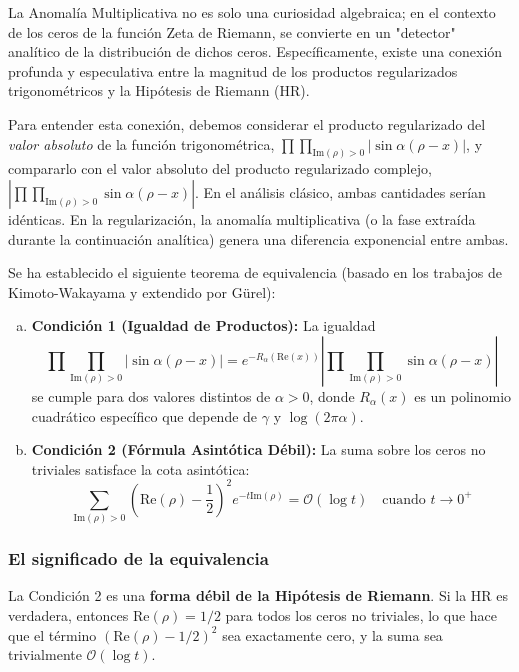La Anomalía Multiplicativa no es solo una curiosidad algebraica; en el contexto de los ceros de la función Zeta de Riemann, se convierte en un "detector" analítico de la distribución de dichos ceros. Específicamente, existe una conexión profunda y especulativa entre la magnitud de los productos regularizados trigonométricos y la Hipótesis de Riemann (HR).

Para entender esta conexión, debemos considerar el producto regularizado del \textit{valor absoluto} de la función trigonométrica, $\prod\prod_{\text{Im}(\rho)>0} |\sin \alpha(\rho - x)|$, y compararlo con el valor absoluto del producto regularizado complejo, $\left| \prod\prod_{\text{Im}(\rho)>0} \sin \alpha(\rho - x) \right|$. En el análisis clásico, ambas cantidades serían idénticas. En la regularización, la anomalía multiplicativa (o la fase extraída durante la continuación analítica) genera una diferencia exponencial entre ambas.

Se ha establecido el siguiente teorema de equivalencia (basado en los trabajos de Kimoto-Wakayama y extendido por Gürel):

\begin{enumerate}[a)]
    \item \textbf{Condición 1 (Igualdad de Productos):} La igualdad
    $$ \prod\prod_{\text{Im}(\rho)>0} |\sin \alpha(\rho - x)| = e^{-R_\alpha(\text{Re}(x))} \left| \prod\prod_{\text{Im}(\rho)>0} \sin \alpha(\rho - x) \right| $$
    se cumple para dos valores distintos de $\alpha > 0$, donde $R_\alpha(x)$ es un polinomio cuadrático específico que depende de $\gamma$ y $\log(2\pi\alpha)$.
    
    \item \textbf{Condición 2 (Fórmula Asintótica Débil):} La suma sobre los ceros no triviales satisface la cota asintótica:
    $$ \sum_{\text{Im}(\rho)>0} \left(\text{Re}(\rho) - \frac{1}{2}\right)^2 e^{-t \text{Im}(\rho)} = \mathcal{O}(\log t) \quad \text{cuando } t \to 0^+ $$
\end{enumerate}

\subsubsection*{El significado de la equivalencia}

La Condición 2 es una \textbf{forma débil de la Hipótesis de Riemann}. Si la HR es verdadera, entonces $\text{Re}(\rho) = 1/2$ para todos los ceros no triviales, lo que hace que el término $\left(\text{Re}(\rho) - 1/2\right)^2$ sea exactamente cero, y la suma sea trivialmente $\mathcal{O}(\log t)$. 

